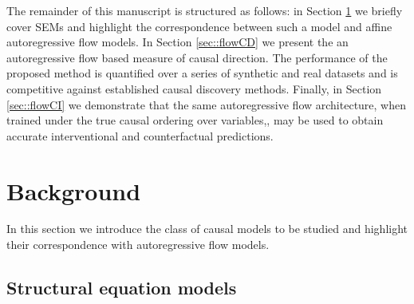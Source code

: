 \documentclass{article}
\begin{document}

The remainder of this manuscript is structured as follows: in Section 
\ref{sec::background} we briefly cover SEMs and highlight the correspondence between such a model and affine autoregressive flow models. In Section \ref{sec::flowCD}
we present the an autoregressive  flow based measure of causal direction. The performance of the
proposed method is quantified over a series of synthetic and real datasets and is competitive
against established causal discovery methods. 
Finally, in Section \ref{sec::flowCI} we demonstrate that 
the same autoregressive flow architecture, when trained under the true causal ordering 
over variables,, may be used to obtain accurate interventional and counterfactual predictions. 



\section{Background}
\label{sec::background}

In this section we 
introduce the class of causal models to be studied and 
highlight their correspondence with autoregressive flow models. 


\subsection{Structural equation models}
\label{sec::SEM}
\end{document}
